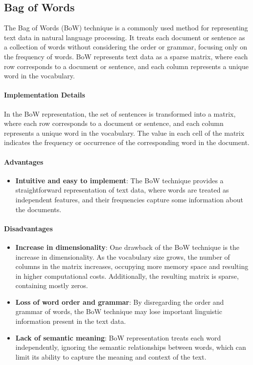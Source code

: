 \documentclass{article}
\begin{document}
\subsection{Bag of Words}

The Bag of Words (BoW) technique is a commonly used method for representing text data in natural language processing. It treats each document or sentence as a collection of words without considering the order or grammar, focusing only on the frequency of words. BoW represents text data as a sparse matrix, where each row corresponds to a document or sentence, and each column represents a unique word in the vocabulary.

\paragraph{Implementation Details}

In the BoW representation, the set of sentences is transformed into a matrix, where each row corresponds to a document or sentence, and each column represents a unique word in the vocabulary. The value in each cell of the matrix indicates the frequency or occurrence of the corresponding word in the document.

\paragraph{Advantages}

\begin{itemize}
\item \textbf{Intuitive and easy to implement}: The BoW technique provides a straightforward representation of text data, where words are treated as independent features, and their frequencies capture some information about the documents.
\end{itemize}

\paragraph{Disadvantages}

\begin{itemize}
\item \textbf{Increase in dimensionality}: One drawback of the BoW technique is the increase in dimensionality. As the vocabulary size grows, the number of columns in the matrix increases, occupying more memory space and resulting in higher computational costs. Additionally, the resulting matrix is sparse, containing mostly zeros.
\item \textbf{Loss of word order and grammar}: By disregarding the order and grammar of words, the BoW technique may lose important linguistic information present in the text data.
\item \textbf{Lack of semantic meaning}: BoW representation treats each word independently, ignoring the semantic relationships between words, which can limit its ability to capture the meaning and context of the text.
\end{itemize}
\end{document}
